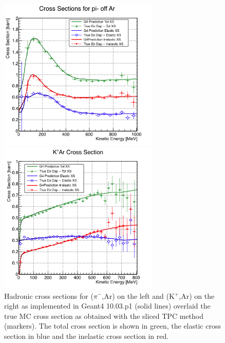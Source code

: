 \begin{figure}
\begin{minipage}[b]{.53\textwidth}  
  \centering  
\includegraphics[width=3in]{Chapter-4/Images/PionTrueXS.png}
\end{minipage}%
\begin{minipage}[b]{0.53\textwidth}  
  \centering  
\includegraphics[width=3in]{Chapter-4/Images/KaonTrueXS.png}
\end{minipage}
\caption{Hadronic cross sections for ($\pi^-$,Ar) on the left and (K$^+$,Ar) on the right as implemented in Geant4 10.03.p1 (solid lines) overlaid the true MC cross section as obtained with the sliced TPC method (markers). The total cross section is shown in green,  the elastic cross section in blue and the inelastic cross section in red.}
\label{fig:TrueMCXS2}
\end{figure}






